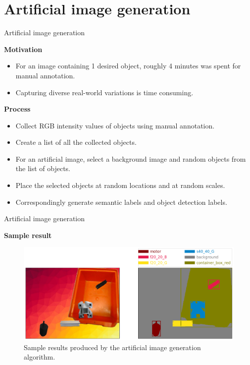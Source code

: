 \documentclass{beamer}
\begin{document}
\section{Artificial image generation}

\begin{frame}{Artificial image generation}

	\textbf{Motivation}
	\begin{small}
		\begin{itemize}
			\item For an image containing 1 desired object, roughly 4 minutes was spent for manual annotation.
			\item Capturing diverse real-world variations is time consuming.
		\end{itemize}
	\end{small}
		
	\vspace{5mm}
		
	\textbf{Process}
	\begin{small}
		\begin{itemize}
			\item Collect RGB intensity values of objects using manual annotation.
			\item Create a list of all the collected objects.
			\item For an artificial image, select a background image and random objects from the list of objects. 
			\item Place the selected objects at random locations and at random scales. 
			\item Correspondingly generate semantic labels and object detection labels.
		\end{itemize}
	\end{small}

\end{frame}

\begin{frame}{Artificial image generation}
	
	\textbf{Sample result}	
		
	\begin{figure}
		\centering
		\includegraphics[scale=0.26]{images/sample_result_1}
		\captionsetup{justification=centering,margin=0.2cm}
		\caption{Sample results produced by the artificial image generation algorithm.}
		\label{Fig:sample}
	\end{figure}
\end{frame}
\end{document}
